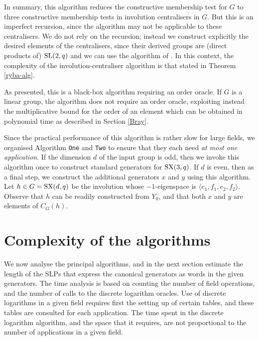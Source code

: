 \documentclass[12pt]{article}
\def\SL{{\rm SL}}
\def\SX{{\rm SX}}
\begin{document}
In summary, this algorithm reduces the constructive
membership test for $G$ to three constructive membership  tests  in involution
centralisers in $G$.  But  this is an imperfect recursion, since  the 
algorithm may not be applicable to these centralisers. 
We do not rely on the recursion; instead we construct
explicitly the desired elements of the centralisers, 
since their derived groups are (direct products of) $\SL(2,q)$
and we can use the algorithm of \cite{Conderetal05}.
In this context, the complexity of the involution-centraliser
algorithm is that stated in Theorem \ref{ryba-alg}.

As presented, this is a black-box algorithm  requiring an order oracle.
If $G$ is a linear group, the algorithm does not require 
an order oracle, exploiting instead the multiplicative 
bound for the order of an element which can
be obtained in polynomial time as described in Section \ref{Bray}.

Since the practical performance of
this algorithm is rather slow for large fields,
we organised Algorithm {\tt One} and {\tt Two}
to ensure that they each need {\it at most one application}. 
If the dimension $d$ of the input group is odd, then we invoke 
this algorithm 
once to construct standard generators for $\SX(3, q)$. 
If $d$ is even, then as a final step, we construct the additional generators 
$x$ and $y$ using this algorithm. 
Let $h \in G=\SX(d, q)$ be the involution whose $-1$-eigenspace
is $\langle e_1, f_1, e_2, f_2 \rangle$. 
Observe that $h$ 
can be readily constructed from $Y_0$, and that both $x$ and $y$
are elements of $C_G(h)$. 

\section{Complexity of the algorithms} 
\label{Analysis}
We now analyse the principal
algorithms, and in the next section estimate the length of the SLPs
that express the canonical generators as words in  the given
generators. The time analysis is based on counting the number of
field operations, and the number of calls to 
the discrete logarithm oracles. Use of discrete
logarithms in a given field requires first the setting up of certain
tables, and these tables are consulted for each application. The
time spent in the discrete logarithm algorithm, and the space that it
requires, are  not proportional to the number of applications in a
given field.
\end{document}
